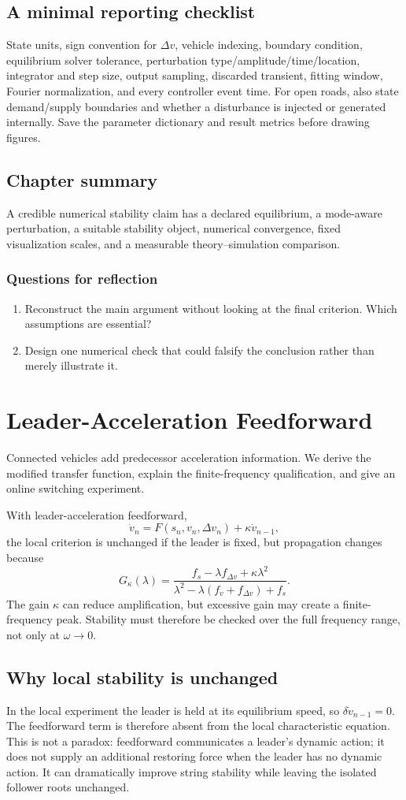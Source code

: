 \documentclass[11pt,a4paper,openany]{book}
\numberwithin{equation}{chapter}
\numberwithin{figure}{chapter}
\numberwithin{table}{chapter}
\newcommand{\chapterguide}[1]{\begin{tcolorbox}[keybox,title=Chapter guide]#1\end{tcolorbox}}
\newcommand{\chapterend}[1]{\section*{Chapter summary}\addcontentsline{toc}{section}{Chapter summary}\begin{tcolorbox}[resultbox]#1\end{tcolorbox}\subsection*{Questions for reflection}\begin{enumerate}[leftmargin=1.7em]\item Reconstruct the main argument without looking at the final criterion. Which assumptions are essential?\item Design one numerical check that could falsify the conclusion rather than merely illustrate it.\end{enumerate}\clearpage}
\begin{document}
\section{A minimal reporting checklist}
State units, sign convention for $\Delta v$, vehicle indexing, boundary condition, equilibrium solver tolerance, perturbation type/amplitude/time/location, integrator and step size, output sampling, discarded transient, fitting window, Fourier normalization, and every controller event time. For open roads, also state demand/supply boundaries and whether a disturbance is injected or generated internally. Save the parameter dictionary and result metrics before drawing figures.

\chapterend{A credible numerical stability claim has a declared equilibrium, a mode-aware perturbation, a suitable stability object, numerical convergence, fixed visualization scales, and a measurable theory--simulation comparison.}

\chapter{Leader-Acceleration Feedforward}
\chapterguide{Connected vehicles add predecessor acceleration information. We derive the modified transfer function, explain the finite-frequency qualification, and give an online switching experiment.}

With leader-acceleration feedforward,
\begin{equation}
\dot v_n=F(s_n,v_n,\Delta v_n)+\kappa\dot v_{n-1},
\end{equation}
the local criterion is unchanged if the leader is fixed, but propagation changes because
\begin{equation}
G_\kappa(\lambda)=
\frac{f_s-\lambda f_{\Delta v}+\kappa\lambda^2}
{\lambda^2-\lambda(f_v+f_{\Delta v})+f_s}.
\end{equation}
The gain $\kappa$ can reduce amplification, but excessive gain may create a finite-frequency peak. Stability must therefore be checked over the full frequency range, not only at $\omega\to0$.

\section{Why local stability is unchanged}
In the local experiment the leader is held at its equilibrium speed, so $\delta\dot v_{n-1}=0$. The feedforward term is therefore absent from the local characteristic equation. This is not a paradox: feedforward communicates a leader's dynamic action; it does not supply an additional restoring force when the leader has no dynamic action. It can dramatically improve string stability while leaving the isolated follower roots unchanged.
\end{document}
